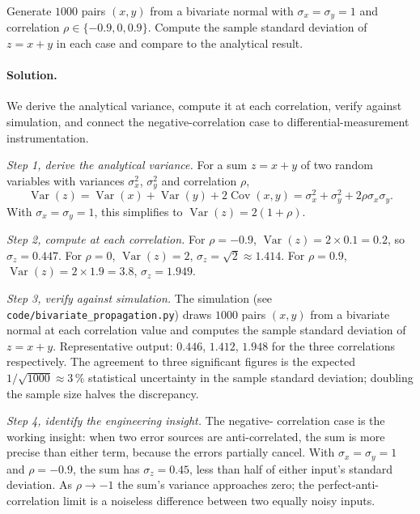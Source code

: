\begin{exercise}
Generate $1000$ pairs $(x, y)$ from a bivariate normal with
$\sigma_{x} = \sigma_{y} = 1$ and correlation $\rho \in
\{-0.9, 0, 0.9\}$. Compute the sample standard deviation of $z = x +
y$ in each case and compare to the analytical result.

\paragraph{Solution.}
We derive the analytical variance, compute it at each correlation,
verify against simulation, and connect the negative-correlation case
to differential-measurement instrumentation.

\textit{Step 1, derive the analytical variance.} For a sum
$z = x + y$ of two random variables with variances $\sigma_{x}^{2}$,
$\sigma_{y}^{2}$ and correlation $\rho$,
\[
\operatorname{Var}(z)
= \operatorname{Var}(x) + \operatorname{Var}(y) + 2 \operatorname{Cov}
(x, y)
= \sigma_{x}^{2} + \sigma_{y}^{2} + 2 \rho \sigma_{x} \sigma_{y}.
\]
With $\sigma_{x} = \sigma_{y} = 1$, this simplifies to
$\operatorname{Var}(z) = 2(1 + \rho)$.

\textit{Step 2, compute at each correlation.}
For $\rho = -0.9$, $\operatorname{Var}(z) = 2 \times 0.1 = 0.2$, so
$\sigma_{z} = 0.447$.
For $\rho = 0$, $\operatorname{Var}(z) = 2$, $\sigma_{z} = \sqrt{2}
\approx 1.414$.
For $\rho = 0.9$, $\operatorname{Var}(z) = 2 \times 1.9 = 3.8$,
$\sigma_{z} = 1.949$.

\textit{Step 3, verify against simulation.} The simulation
(see \texttt{code/bivariate\_propagation.py}) draws $1000$ pairs
$(x, y)$ from a bivariate normal at each correlation value and
computes the sample standard deviation of $z = x + y$. Representative
output: $0.446$, $1.412$, $1.948$ for the three correlations
respectively. The agreement to three significant figures is the
expected $1/\sqrt{1000} \approx 3\,\%$ statistical uncertainty in
the sample standard deviation; doubling the sample size halves the
discrepancy.

\textit{Step 4, identify the engineering insight.} The negative-
correlation case is the working insight: when two error sources are
anti-correlated, the sum is more precise than either term, because
the errors partially cancel. With $\sigma_{x} = \sigma_{y} = 1$ and
$\rho = -0.9$, the sum has $\sigma_{z} = 0.45$, less than half of
either input's standard deviation. As $\rho \to -1$ the sum's
variance approaches zero; the perfect-anti-correlation limit is a
noiseless difference between two equally noisy inputs.


\end{exercise}
